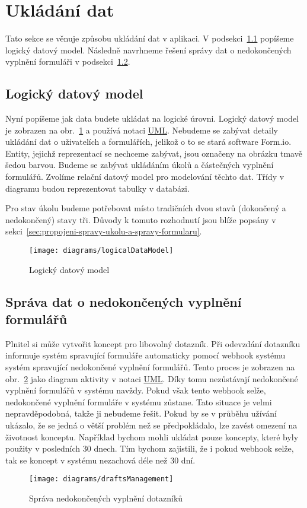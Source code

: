 \section{Ukládání dat}\label{sec:ukladani-dat}

Tato sekce se věnuje způsobu ukládání dat v aplikaci.
V podsekci~\ref{subsec:logicky-datovy-model} popíšeme logický datový model.
Následně navrhneme řešení správy dat o nedokončených vyplnění formuláři v podsekci~\ref{subsec:sprava-dat-o-nedokoncenych-vyplneni-formularu}.

\subsection{Logický datový model}\label{subsec:logicky-datovy-model}

Nyní popíšeme jak data budete ukládat na logické úrovni.
Logický datový model je zobrazen na obr.~\ref{fig:logical-data-model} a používá notaci \href{https://www.omg.org/spec/UML/2.5.1/PDF}{UML}.
Nebudeme se zabývat detaily ukládání dat o uživatelích a formulářích, jelikož o to se stará software Form.io.
Entity, jejichž reprezentací se nechceme zabývat, jsou označeny na obrázku tmavě šedou barvou.
Budeme se zabývat ukládáním úkolů a částečných vyplnění formulářů.
Zvolíme relační datový model pro modelování těchto dat.
Třídy v diagramu budou reprezentovat tabulky v databázi.

Pro stav úkolu budeme potřebovat místo tradičních dvou stavů (dokončený a nedokončený) stavy tři.
Důvody k tomuto rozhodnutí jsou blíže popsány v sekci~\ref{sec:propojeni-spravy-ukolu-a-spravy-formularu}.

\begin{figure}[H]
    \centering
    \texttt{[image: diagrams/logicalDataModel]}
    \caption{Logický datový model}\label{fig:logical-data-model}
\end{figure}

\subsection{Správa dat o nedokončených vyplnění formulářů}\label{subsec:sprava-dat-o-nedokoncenych-vyplneni-formularu}

Plnitel si může vytvořit koncept pro libovolný dotazník.
Při odevzdání dotazníku informuje systém spravující formuláře automaticky pomocí webhook systému systém spravující nedokončené vyplnění formulářů.
Tento proces je zobrazen na obr.~\ref{fig:drafts-management} jako diagram aktivity v notaci \href{https://www.omg.org/spec/UML/2.5.1/PDF}{UML}.
Díky tomu nezůstávají nedokončené vyplnění formulářů v systému navždy.
Pokud však tento webhook selže, nedokončené vyplnění formuláře v systému zůstane.
Tato situace je velmi nepravděpodobná, takže ji nebudeme řešit.
Pokud by se v průběhu užívání ukázalo, že se jedná o větší problém než se předpokládalo, lze zavést omezení na životnost konceptu.
Například bychom mohli ukládat pouze koncepty, které byly použity v posledních 30 dnech.
Tím bychom zajistili, že i pokud webhook selže, tak se koncept v systému nezachová déle než 30 dní.

\begin{figure}[H]
    \centering
    \texttt{[image: diagrams/draftsManagement]}
    \caption{Správa nedokončených vyplnění dotazníků}\label{fig:drafts-management}
\end{figure}
